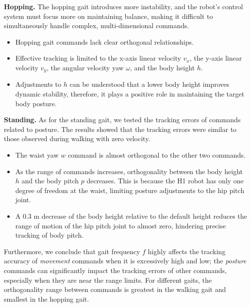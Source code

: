 \noindent\textbf{Hopping.}
The hopping gait introduces more instability, and the robot's control system must focus more on maintaining balance, making it difficult to simultaneously handle complex, multi-dimensional commands.
\begin{itemize}[leftmargin=*]
    \item Hopping gait commands lack clear orthogonal relationships.
    \item Effective tracking is limited to the x-axis {linear velocity} $v_x$, the y-axis {linear velocity} $v_y$, the {angular velocity yaw} $\omega$, and the {body height} $h$.
    \item Adjustments to $h$ can be understood that a lower body height improves dynamic stability, therefore, it plays a positive role in maintaining the target body posture.
\end{itemize}

\noindent\textbf{Standing.} As for the standing gait, we tested the tracking errors of commands related to posture. The results showed that the tracking errors were similar to those observed during walking with zero velocity.

\begin{itemize}[leftmargin=*]
    \item The {waist yaw} $w$ command is almost orthogonal to the other two commands.
    \item As the range of commands increases, orthogonality between the {body height} $h$ and the {body pitch} $p$ decreases. This is because the H1 robot has only one degree of freedom at the waist, limiting posture adjustments to the hip pitch joint.
    \item A 0.3 m decrease of the body height relative to the default height reduces the range of motion of the hip pitch joint to almost zero, hindering precise tracking of body pitch.
\end{itemize}

Furthermore, we conclude that {gait frequency} $f$ highly affects the tracking accuracy of \emph{movement} commands when it is excessively high and low; the \emph{posture} commands can significantly impact the tracking errors of other commands, especially when they are near the range limits.
For different gaits, the orthogonality range between commands is greatest in the walking gait and smallest in the hopping gait.

